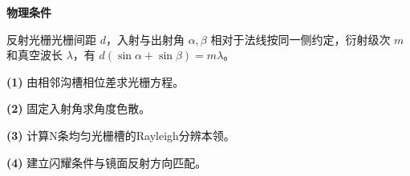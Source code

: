 \textbf{物理条件}\par 反射光栅光栅间距 \(d\)，入射与出射角 \(\alpha,\beta\) 相对于法线按同一侧约定，衍射级次 \(m\) 和真空波长 \(\lambda\)，有 \(d(\sin\alpha+\sin\beta)=m\lambda\)。
\par\noindent\textbf{(1)} 由相邻沟槽相位差求光栅方程。
\par\noindent\textbf{(2)} 固定入射角求角度色散。
\par\noindent\textbf{(3)} 计算N条均匀光栅槽的Rayleigh分辨本领。
\par\noindent\textbf{(4)} 建立闪耀条件与镜面反射方向匹配。
